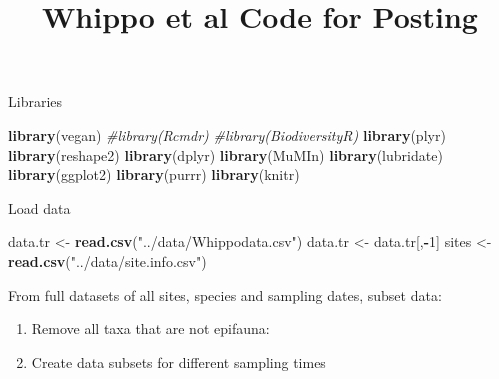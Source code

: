 \documentclass[]{article}
\title{Whippo et al Code for Posting}
\author{}
\date{}
\newenvironment{Shaded}{\begin{snugshade}}{\end{snugshade}}
\newcommand{\KeywordTok}[1]{\textcolor[rgb]{0.13,0.29,0.53}{\textbf{#1}}}
\newcommand{\DecValTok}[1]{\textcolor[rgb]{0.00,0.00,0.81}{#1}}
\newcommand{\StringTok}[1]{\textcolor[rgb]{0.31,0.60,0.02}{#1}}
\newcommand{\CommentTok}[1]{\textcolor[rgb]{0.56,0.35,0.01}{\textit{#1}}}
\newcommand{\OperatorTok}[1]{\textcolor[rgb]{0.81,0.36,0.00}{\textbf{#1}}}
\newcommand{\NormalTok}[1]{#1}
\begin{document}
\maketitle

Libraries

\begin{Shaded}
\begin{Highlighting}[]
\KeywordTok{library}\NormalTok{(vegan)}
\CommentTok{#library(Rcmdr)}
\CommentTok{#library(BiodiversityR)}
\KeywordTok{library}\NormalTok{(plyr)}
\KeywordTok{library}\NormalTok{(reshape2)}
\KeywordTok{library}\NormalTok{(dplyr)}
\KeywordTok{library}\NormalTok{(MuMIn)}
\KeywordTok{library}\NormalTok{(lubridate)}
\KeywordTok{library}\NormalTok{(ggplot2)}
\KeywordTok{library}\NormalTok{(purrr)}
\KeywordTok{library}\NormalTok{(knitr)}
\end{Highlighting}
\end{Shaded}

Load data

\begin{Shaded}
\begin{Highlighting}[]
\NormalTok{data.tr <-}\StringTok{ }\KeywordTok{read.csv}\NormalTok{(}\StringTok{"../data/Whippodata.csv"}\NormalTok{)}
\NormalTok{data.tr <-}\StringTok{ }\NormalTok{data.tr[,}\OperatorTok{-}\DecValTok{1}\NormalTok{]}
\NormalTok{sites <-}\StringTok{ }\KeywordTok{read.csv}\NormalTok{(}\StringTok{"../data/site.info.csv"}\NormalTok{)}
\end{Highlighting}
\end{Shaded}

From full datasets of all sites, species and sampling dates, subset
data:

\begin{enumerate}
\def\labelenumi{\arabic{enumi}.}
\item
  Remove all taxa that are not epifauna:
\item
  Create data subsets for different sampling times
\end{enumerate}
\end{document}
